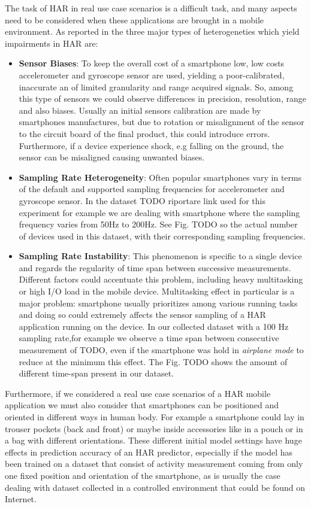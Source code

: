 The task of HAR in real use case scenarios is a difficult task, and many aspects need to be considered when these applications are brought in a mobile environment. As reported in \cite{blunck2013heterogeneity} the three major types of heterogeneties which yield impairments in HAR are:
\begin{itemize}
	\item \textbf{Sensor Biases}: To keep the overall cost of a smartphone low, low costs accelerometer and gyroscope sensor are used, yielding a poor-calibrated, inaccurate an of limited granularity and range acquired signals. So, among this type of sensors we could observe differences in precision, resolution, range and also biases. Usually an initial sensors calibration are made by smartphones manufactures, but due to rotation or misalignment of the sensor to the circuit board of the final product, this could introduce errors. Furthermore, if a device experience shock, e.g falling on the ground, the sensor can be misaligned causing unwanted biases.
	\item \textbf{Sampling Rate Heterogeneity}: Often popular smartphones vary in terms of the default and supported sampling frequencies for accelerometer and gyroscope sensor. In the dataset TODO riportare link used for this experiment for example we are dealing with smartphone where the sampling frequency varies from 50Hz to 200Hz. See Fig. TODO so the actual number of devices used in this dataset, with their corresponding sampling frequencies.
	\item \textbf{Sampling Rate Instability}: This phenomenon is specific to a single device and regards the regularity of time span between successive measurements. Different factors could accentuate this problem, including heavy multitasking or high I/O load in the mobile device. Multitasking effect in particular is a major problem: smartphone usually prioritizes among various running tasks and doing so could extremely affects the sensor sampling of a HAR application running on the device. In our collected dataset with a 100 Hz sampling rate,for example we observe a time span between consecutive measurement of TODO, even if the smartphone was hold in \textit{airplane mode} to reduce at the minimum this effect. The Fig. TODO shows the amount of different time-span present in our dataset.
\end{itemize}

Furthermore, if we considered a real use case scenarios of a HAR mobile application we must also consider that smartphones can be positioned and oriented in different ways in human body. For example a smartphone could lay in trouser pockets (back and front) or maybe inside accessories like in a pouch or in a bag with different orientations. These different initial model settings have huge effects in prediction accuracy of an HAR predictor, especially if the model has been trained on a dataset that consist of activity measurement coming from only one fixed position and orientation of the smartphone, as is usually the case dealing with dataset collected in a controlled environment that could be found on Internet. 

